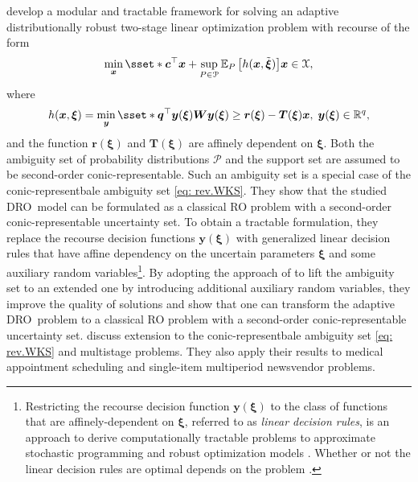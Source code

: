 \documentclass[final,onefignum,onetabnum]{class}
\newcommand{\ee}[2]{\mathbb{E}_{#1} \left[ #2 \right]}
\newcommand{\bs}[1]{\boldsymbol{#1}} %
\newcommand{\Bs}[1]{\mathbb{#1}} %
\newcommand{\Cs}[1]{\mathcal{#1}} %
\newcommand{\txi}{\tilde{\bs{\xi}}}
\newcommand{\dro}{DRO}
\begin{document}
\citet{bertsimas2018adaptiveDRO} develop a modular and tractable framework for solving an adaptive distributionally robust two-stage linear optimization problem with recourse of the form
\begin{equation*}
    \min_{\bs{x}}\sset*{\bs{c}^{\top}\bs{x} +\sup_{P \in \Cs{P}} \ee{P}{h(\bs{x}, \txi)}}{ \bs{x} \in \Cs{X}},
\end{equation*}
where 
\begin{equation*}
    h(\bs{x},\bs{\xi})=\min_{\bs{y}}\sset*{\bs{q}^{\top}\bs{y}(\bs{\xi})}{\bs{W}\bs{y}(\bs{\xi}) \ge \bs{r}(\bs{\xi}) - \bs{T}(\bs{\xi}) \bs{x}, \; \bs{y}(\bs{\xi}) \in \Bs{R}^{q}},
\end{equation*}
and the function $\bs{r}(\bs{\xi})$ and $\bs{T}(\bs{\xi})$ are affinely dependent on $\bs{\xi}$.
Both the ambiguity set of probability distributions $\Cs{P}$ and the support set are assumed to be second-order conic-representable. Such an ambiguity set is a special case of   the conic-representbale ambiguity set \eqref{eq: rev.WKS}.  
They show that the studied \dro\ model can be formulated as a classical RO problem with a second-order conic-representable uncertainty set.
To obtain a tractable formulation, they  replace the recourse  decision functions $\bs{y}(\bs{\xi})$ with generalized linear decision rules that have affine dependency on the uncertain parameters $\bs{\xi}$ and some auxiliary random variables\footnote{Restricting the recourse decision function $\bs{y}(\bs{\xi})$ to the class of functions that are affinely-dependent on $\bs{\xi}$, referred to as {\it linear decision rules}, is an approach to derive computationally tractable problems to approximate stochastic programming and robust optimization models \cite{chen2007robust,chen2008linear,ben2004adjustable}. Whether or not the linear decision rules are optimal depends on the problem \cite{shapiro2005complexity}.}. By adopting the approach of  \citet{wiesemann2014} 
to lift the  ambiguity set to an extended one by introducing additional auxiliary random variables, they improve the quality of solutions and show that one can transform the adaptive \dro\ problem to a classical RO problem with a second-order conic-representable uncertainty
set. %
\citet{bertsimas2018adaptiveDRO} discuss extension to the conic-representbale ambiguity set \eqref{eq: rev.WKS} and multistage problems. 
They also apply their results to medical appointment scheduling and single-item multiperiod newsvendor problems. 
\end{document}
